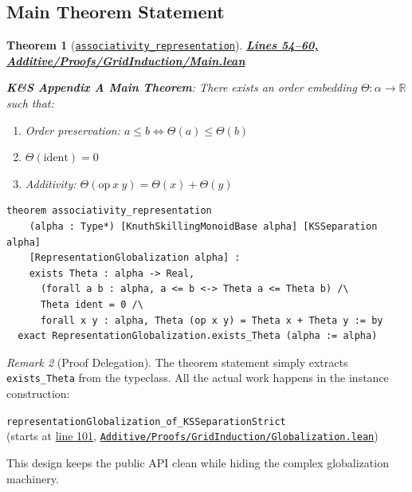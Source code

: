 \documentclass[11pt]{article}
\newtheorem{theorem}{Theorem}[section]
\theoremstyle{definition}
\theoremstyle{remark}
\newtheorem{remark}[theorem]{Remark}
\begin{document}
\subsection{Main Theorem Statement}

\begin{theorem}[\href{https://github.com/zariuq/ks-foundations-of-inference/blob/main/KnuthSkilling/Additive/Proofs/GridInduction/Main.lean\#L54}{\texttt{associativity\_representation}}]
\textbf{\href{https://github.com/zariuq/ks-foundations-of-inference/blob/main/KnuthSkilling/Additive/Proofs/GridInduction/Main.lean\#L54-L60}{Lines 54--60, Additive/Proofs/GridInduction/Main.lean}}

\textbf{K\&S Appendix A Main Theorem}: There exists an order embedding $\Theta : \alpha \to \mathbb{R}$ such that:
\begin{enumerate}
\item Order preservation: $a \leq b \Leftrightarrow \Theta(a) \leq \Theta(b)$
\item $\Theta(\text{ident}) = 0$
\item Additivity: $\Theta(\text{op}\ x\ y) = \Theta(x) + \Theta(y)$
\end{enumerate}
\end{theorem}

\begin{lstlisting}[caption={Appendix A Representation Theorem (public API)}]
theorem associativity_representation
    (alpha : Type*) [KnuthSkillingMonoidBase alpha] [KSSeparation alpha]
    [RepresentationGlobalization alpha] :
    exists Theta : alpha -> Real,
      (forall a b : alpha, a <= b <-> Theta a <= Theta b) /\
      Theta ident = 0 /\
      forall x y : alpha, Theta (op x y) = Theta x + Theta y := by
  exact RepresentationGlobalization.exists_Theta (alpha := alpha)
\end{lstlisting}

\begin{remark}[Proof Delegation]
The theorem statement simply extracts \texttt{exists\_Theta} from the typeclass.
All the actual work happens in the instance construction:

\texttt{representationGlobalization\_of\_KSSeparationStrict}
\\
(starts at \href{https://github.com/zariuq/ks-foundations-of-inference/blob/main/KnuthSkilling/Additive/Proofs/GridInduction/Globalization.lean\#L101}{line 101}, \href{https://github.com/zariuq/ks-foundations-of-inference/blob/main/KnuthSkilling/Additive/Proofs/GridInduction/Globalization.lean}{\texttt{Additive/Proofs/GridInduction/Globalization.lean}})

This design keeps the public API clean while hiding the complex globalization machinery.
\end{remark}
\end{document}
